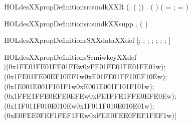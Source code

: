 \newcommand{\HOLdesXXpropDefinitionsroundkXXL}{\UseVerbatim{HOLdesXXpropDefinitionsroundkXXL}}
\begin{SaveVerbatim}{HOLdesXXpropDefinitionsroundkXXR}
\HOLTokenTurnstile{} (\HOLSymConst{\HOLTokenForall{}}.    \HOLSymConst{=}  ( )) \HOLSymConst{\HOLTokenConj{}}
   \HOLSymConst{\HOLTokenForall{}} .
      ( )  \HOLSymConst{=}
     (  =   ;  =      \HOLSymConst{\HOLTokenRol{}} )
\end{SaveVerbatim}
\newcommand{\HOLdesXXpropDefinitionsroundkXXR}{\UseVerbatim{HOLdesXXpropDefinitionsroundkXXR}}
\begin{SaveVerbatim}{HOLdesXXpropDefinitionsroundkXXsupp}
\HOLTokenTurnstile{} \HOLSymConst{\HOLTokenForall{}} .    \HOLSymConst{=} (  \HOLSymConst{,}  )
\end{SaveVerbatim}
\newcommand{\HOLdesXXpropDefinitionsroundkXXsupp}{\UseVerbatim{HOLdesXXpropDefinitionsroundkXXsupp}}
\begin{SaveVerbatim}{HOLdesXXpropDefinitionsSXXdataXXdef}
\HOLTokenTurnstile{}  \HOLSymConst{=}
   [; ; ; ; ; ;
    ; ]
\end{SaveVerbatim}
\newcommand{\HOLdesXXpropDefinitionsSXXdataXXdef}{\UseVerbatim{HOLdesXXpropDefinitionsSXXdataXXdef}}
\begin{SaveVerbatim}{HOLdesXXpropDefinitionsSemiwkeyXXdef}
\HOLTokenTurnstile{}  \HOLSymConst{=}
   [(0x1FE01FE01FE01FEw\HOLSymConst{,}0xFE01FE01FE01FE01w);
    (0x1FE01FE00EF10EF1w\HOLSymConst{,}0xE01FE01FF10EF10Ew);
    (0x1E001E001F101F1w\HOLSymConst{,}0xE001E001F101F101w);
    (0x1FFE1FFE0EFE0EFEw\HOLSymConst{,}0xFE1FFE1FFE0EFE0Ew);
    (0x11F011F010E010Ew\HOLSymConst{,}0x1F011F010E010E01w);
    (0xE0FEE0FEF1FEF1FEw\HOLSymConst{,}0xFEE0FEE0FEF1FEF1w)]
\end{SaveVerbatim}
\newcommand{\HOLdesXXpropDefinitionsSemiwkeyXXdef}{\UseVerbatim{HOLdesXXpropDefinitionsSemiwkeyXXdef}}
